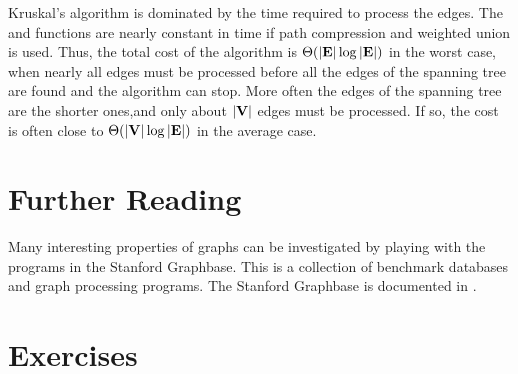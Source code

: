 Kruskal's algorithm is dominated by the time required to
process the edges.
The  and  functions are nearly
constant in time if path compression and weighted union is used.
Thus, the total cost of the algorithm is
\(\Theta(|{\textbf{E}}| \log |{\textbf{E}}|)\) in the worst case,
when nearly all edges must be processed before all the edges of the
spanning tree are found and the algorithm can stop.
More often the edges of the spanning tree are the shorter ones,and
only about \(|{\textbf{V}}|\) edges must be processed.
If so, the cost is often close to \(\Theta(|{\textbf{V}}| \log |{\textbf{E}}|)\) 
in the average case.

\newpage

\section{Further Reading}

Many interesting properties of graphs can be investigated by playing
with the programs in the Stanford Graphbase.
This is a collection of benchmark databases and graph processing
programs.
The Stanford Graphbase is documented in \cite{GraphBase}.

\section{Exercises}

